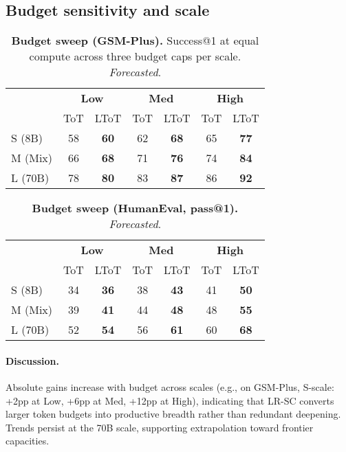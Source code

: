 \documentclass{article}
\begin{document}
\subsection{Budget sensitivity and scale}
\label{subsec:frontier-results-budget}

\begin{table}[t]
\centering
\caption{\textbf{Budget sweep (GSM-Plus).} Success@1 at equal compute across three budget caps per scale. \emph{Forecasted}.}
\vspace{0.3em}
\begin{tabular}{lcccccc}
\toprule
 & \multicolumn{2}{c}{\textbf{Low}} & \multicolumn{2}{c}{\textbf{Med}} & \multicolumn{2}{c}{\textbf{High}} \\
\cmidrule(lr){2-3}\cmidrule(lr){4-5}\cmidrule(lr){6-7}
 & ToT & LToT & ToT & LToT & ToT & LToT \\
\midrule
S (8B)  & 58 & \textbf{60} & 62 & \textbf{68} & 65 & \textbf{77} \\
M (Mix) & 66 & \textbf{68} & 71 & \textbf{76} & 74 & \textbf{84} \\
L (70B) & 78 & \textbf{80} & 83 & \textbf{87} & 86 & \textbf{92} \\
\bottomrule
\end{tabular}
\label{tab:budget-gsm}
\end{table}

\begin{table}[t]
\centering
\caption{\textbf{Budget sweep (HumanEval, pass@1).} \emph{Forecasted}.}
\vspace{0.3em}
\begin{tabular}{lcccccc}
\toprule
 & \multicolumn{2}{c}{\textbf{Low}} & \multicolumn{2}{c}{\textbf{Med}} & \multicolumn{2}{c}{\textbf{High}} \\
\cmidrule(lr){2-3}\cmidrule(lr){4-5}\cmidrule(lr){6-7}
 & ToT & LToT & ToT & LToT & ToT & LToT \\
\midrule
S (8B)  & 34 & \textbf{36} & 38 & \textbf{43} & 41 & \textbf{50} \\
M (Mix) & 39 & \textbf{41} & 44 & \textbf{48} & 48 & \textbf{55} \\
L (70B) & 52 & \textbf{54} & 56 & \textbf{61} & 60 & \textbf{68} \\
\bottomrule
\end{tabular}
\label{tab:budget-he}
\end{table}

\paragraph{Discussion.}
Absolute gains increase with budget across scales (e.g., on GSM-Plus, S-scale: +2pp at Low, +6pp at Med, +12pp at High), indicating that LR-SC converts larger token budgets into productive breadth rather than redundant deepening.
Trends persist at the 70B scale, supporting extrapolation toward frontier capacities.
\end{document}
